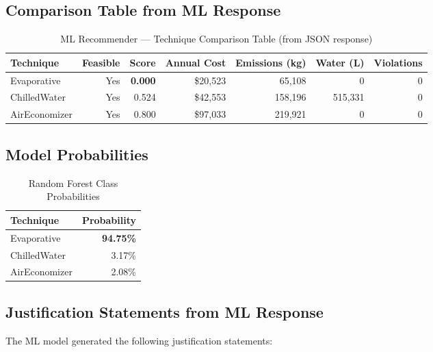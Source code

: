 \documentclass[12pt,a4paper]{report}
\begin{document}
\subsection{Comparison Table from ML Response}

\begin{table}[H]
\centering
\caption{ML Recommender --- Technique Comparison Table (from JSON response)}
\label{tab:ml_comparison}
\renewcommand{\arraystretch}{1.3}
\begin{tabular}{lrrrrrr}
\toprule
\textbf{Technique} & \textbf{Feasible} & \textbf{Score} & \textbf{Annual Cost} & \textbf{Emissions (kg)} & \textbf{Water (L)} & \textbf{Violations} \\
\midrule
Evaporative & Yes & \textbf{0.000} & \$20{,}523 & 65{,}108 & 0 & 0 \\
ChilledWater & Yes & 0.524 & \$42{,}553 & 158{,}196 & 515{,}331 & 0 \\
AirEconomizer & Yes & 0.800 & \$97{,}033 & 219{,}921 & 0 & 0 \\
\bottomrule
\end{tabular}
\end{table}

\subsection{Model Probabilities}

\begin{table}[H]
\centering
\caption{Random Forest Class Probabilities}
\label{tab:ml_probs}
\renewcommand{\arraystretch}{1.3}
\begin{tabular}{lr}
\toprule
\textbf{Technique} & \textbf{Probability} \\
\midrule
Evaporative & \textbf{94.75\%} \\
ChilledWater & 3.17\% \\
AirEconomizer & 2.08\% \\
\bottomrule
\end{tabular}
\end{table}

\subsection{Justification Statements from ML Response}

The ML model generated the following justification statements:
\end{document}
